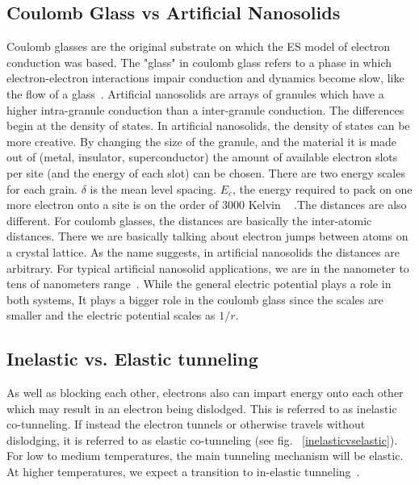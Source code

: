 \subsection{Coulomb Glass vs Artificial Nanosolids}
Coulomb glasses are the original substrate on which the ES model of electron conduction was based. The "glass" in coulomb glass refers to a phase in which electron-electron interactions impair conduction and dynamics become slow, like the flow of a glass~\cite{ortuno04}. Artificial nanosolids are arrays of granules which have a higher intra-granule conduction than a inter-granule conduction. The differences begin at the density of states. In artificial nanosolids, the density of states can be more creative. By changing the size of the granule, and the material it is made out of (metal, insulator, superconductor) the amount of available electron slots per site (and the energy of each slot) can be chosen. There are two energy scales for each grain. $\delta$ is the mean level spacing. $E_c$, the energy required to pack on one more electron onto a site is on the order of 3000 Kelvin ~\cite{glatz08} .The distances are also different. For coulomb glasses, the distances are basically the inter-atomic distances. There we are basically talking about electron jumps between atoms on a crystal lattice. As the name suggests, in artificial nanosolids the distances are arbitrary. For typical artificial nanosolid applications, we are in the nanometer to tens of nanometers range~\cite{beloborodov05}. While the general electric potential plays a role in both systems, It plays a bigger role in the coulomb glass since the scales are smaller and the electric potential scales as $1/r$.

\subsection{Inelastic vs. Elastic tunneling}
As well as blocking each other, electrons also can impart energy onto each other which may result in an electron being dislodged. This is referred to as inelastic co-tunneling. If instead the electron tunnels or otherwise travels without dislodging, it is referred to as elastic co-tunneling (see fig. ~\ref{inelasticvselastic}). For low to medium temperatures, the main tunneling mechanism will be elastic. At higher temperatures, we expect a transition to in-elastic tunneling~\cite{Glazman05}.

